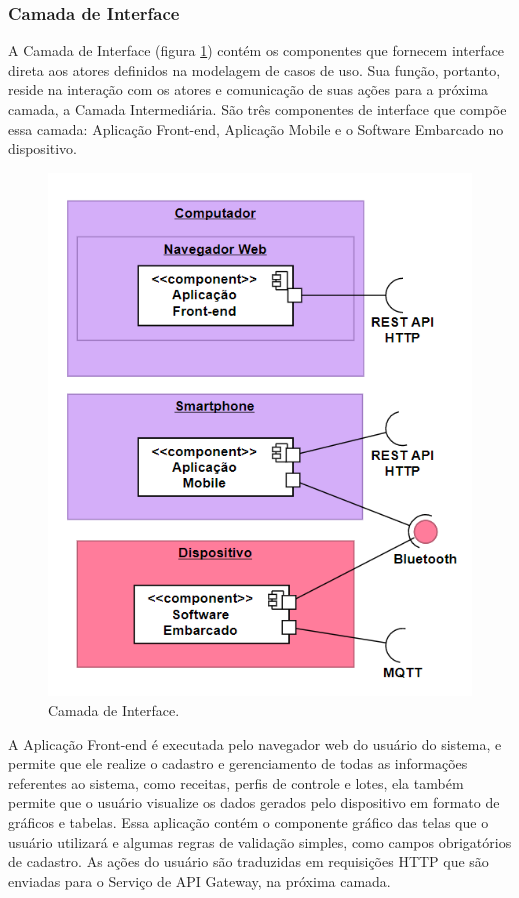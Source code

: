 \subsubsection{Camada de Interface}
A Camada de Interface (figura \ref{fig:camada_interface}) contém os componentes que fornecem interface direta aos atores definidos na modelagem de casos de uso. Sua função, portanto, reside na interação com os atores e comunicação de suas ações para a próxima camada, a Camada Intermediária. São três componentes de interface que compõe essa camada: Aplicação Front-end, Aplicação Mobile e o Software Embarcado no dispositivo. 

\begin{figure}[H]
    \centering
    \includegraphics[scale=0.50]{figuras/projeto/software/camada_interface.PNG}
    \caption{Camada de Interface.}
    \label{fig:camada_interface}
\end{figure}

A Aplicação Front-end é executada pelo navegador web do usuário do sistema, e permite que ele realize o cadastro e gerenciamento de todas as informações referentes ao sistema, como receitas, perfis de controle e lotes, ela também permite que o usuário visualize os dados gerados pelo dispositivo em formato de gráficos e tabelas. Essa aplicação contém o componente gráfico das telas que o usuário utilizará e algumas regras de validação simples, como campos obrigatórios de cadastro. As ações do usuário são traduzidas em requisições HTTP que são enviadas para o Serviço de API Gateway, na próxima camada. 

